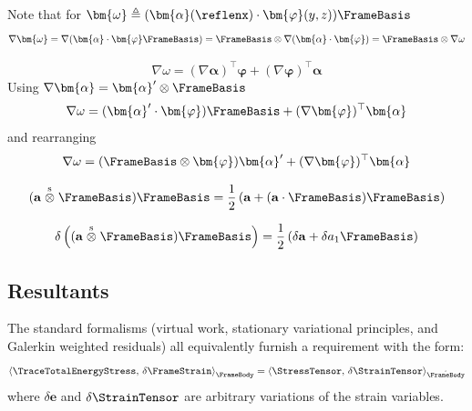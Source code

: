 \begin{Details}
Note that for $\bm{\omega} \triangleq (\bm{\alpha}(\reflenx)\cdot\bm{\varphi}(y,z))\FrameBasis$
$$
\nabla \bm{\omega} = \nabla (\bm{\alpha}\cdot\bm{\varphi}\FrameBasis) = \FrameBasis\otimes\nabla(\bm{\alpha}\cdot\bm{\varphi}) = \FrameBasis\otimes\nabla\omega
$$

$$
\nabla \omega = (\nabla\bm{\alpha})^{\top}\bm{\varphi}  +(\nabla\bm{\varphi})^{\top}\bm{\alpha} 
$$
Using $\nabla \bm{\alpha} = \bm{\alpha}'\otimes\FrameBasis$
$$
\nabla \omega = (\bm{\alpha}^{\prime}\cdot\bm{\varphi}) \FrameBasis +(\nabla\bm{\varphi})^{\top}\bm{\alpha}
$$
and rearranging
$$
\nabla \omega = (\FrameBasis\otimes\bm{\varphi}) \bm{\alpha}' + (\nabla\bm{\varphi})^{\top}\bm{\alpha}
$$

$$
(\mathbf{a}\stackrel{\mathrm{s}}{\otimes}\FrameBasis)\FrameBasis
=\frac{1}{2} \left(\mathbf{a} + (\mathbf{a}\cdot\FrameBasis)\FrameBasis\right)
$$

$$
\delta \left((\mathbf{a}\stackrel{\mathrm{s}}{\otimes}\FrameBasis)\FrameBasis\right) = \frac{1}{2}\left(\delta \mathbf{a} + \delta a_1 \FrameBasis\right)
$$
\end{Details}

\subsection{Resultants}

The standard formalisms (virtual work, stationary variational principles, and Galerkin weighted residuals) all equivalently furnish a requirement with the form:
\begin{equation}
\left<\TraceTotalEnergyStress,\,\delta\FrameStrain\right>_{\FrameBody}=\left<\StressTensor ,\,\delta\StrainTensor\right>_{\hat{\FrameBody}}
\label{eq:seSE}
\end{equation}
where \(\delta \bm{e}\) and \(\delta \StrainTensor\) are arbitrary variations of the strain variables.

